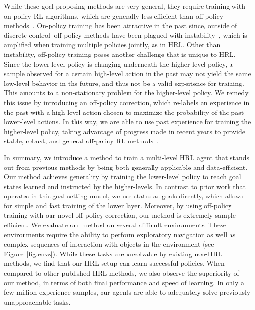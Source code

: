 \documentclass{article}
\begin{document}
While these goal-proposing methods are very general, they require training with on-policy RL algorithms, which are generally less efficient than off-policy methods~\cite{gu2016q,tpcl}. 
On-policy training has been attractive in the past since, outside of discrete control, off-policy methods have been plagued with instability~\cite{gu2016q}, which is amplified when training multiple policies jointly, as in HRL.
Other than instability, off-policy training poses another challenge that is unique to HRL. Since the lower-level policy is changing underneath the higher-level policy, a sample observed for a certain high-level action in the past may not yield the same low-level behavior in the future, and thus not be a valid experience for training. This amounts to a non-stationary problem for the higher-level policy. We remedy this issue by introducing an off-policy correction, which re-labels an experience in the past with a high-level action chosen to maximize the probability of the past lower-level actions.  In this way, we are able to use past experience for training the higher-level policy, taking advantage of progress made in recent years to provide stable, robust, and general off-policy RL methods~\cite{td3, tpcl, barth2018distributed}.

In summary, we introduce a method to train a multi-level HRL agent that stands out from previous methods by being both generally applicable and data-efficient.  Our method achieves generality by training the lower-level policy to reach goal states learned and instructed by the higher-levels.
In contrast to prior work that operates in this goal-setting model, we use states as goals directly, which allows for simple and fast training of the lower layer. %
Moreover, by using off-policy training with our novel off-policy correction, our method is extremely sample-efficient.
We evaluate our method on several difficult environments.  
These environments require the ability to perform exploratory navigation as well as complex sequences of interaction with objects in the environment (see Figure~\ref{fig:envs}). 
While these tasks are unsolvable by existing non-HRL methods,
we find that our HRL setup can learn successful policies.
When compared to other published HRL methods, we also observe the superiority of our method, in terms of both final performance and speed of learning.  In only a few million experience samples, our agents are able to adequately solve previously unapproachable tasks.
\end{document}
